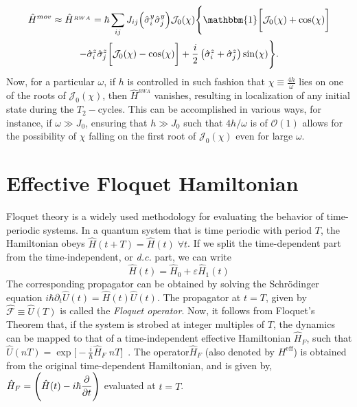 \documentclass[12pt]{iopart}
\begin{document}
\begin{multline}
    \hat{H}^{mov}\approx \hat{H}^{_{RWA}} = \hbar\sum_{ij} J_{ij} \Big(\hat{\sigma}^y_i\hat{\sigma}^y_j\Big) \mathcal{J}_0(\chi)\Bigg\{\mathbbm{1}\bigg[\mathcal{J}_0(\chi) + \cos(\chi)\bigg] \\
    -\hat{\sigma}^z_i\hat{\sigma}^z_j \bigg[\mathcal{J}_0(\chi) - \cos(\chi)\bigg] + \frac{i}{2} \left(\hat{\sigma}^z_i + \hat{\sigma}^z_j\right) \sin(\chi)\Bigg\}.
    \label{eq:hrwa}
\end{multline}	
Now, for a particular $\omega$, if $h$ is controlled in such fashion that $\chi\equiv\frac{4h}{\omega}$ lies on one of the roots of $\mathcal{J}_0(\chi)$, then $\hat{H}^{_{RWA}}$ vanishes, resulting in localization of any initial state during the $T_2-$cycles. This can be accomplished in various ways, for instance, if $\omega\gg J_0$, ensuring that $h\gg J_0$ such that $4h/\omega$ is of $\mathcal{O}(1)$ allows for the possibility of $\chi$ falling on the first root of $\mathcal{J}_0(\chi)$ even for large $\omega$.

\section{\label{sec:AppendixB} Effective Floquet Hamiltonian}

Floquet theory is a widely used methodology for evaluating the behavior of time-periodic systems.  In a quantum system that is time periodic with period $T$, the Hamiltonian obeys $\hat{H}(t+T) = \hat{H}(t)\;\forall t$. If we split the time-dependent part from the time-independent, or \textit{d.c.} part, we can write
\begin{equation*}
    \hat{H}(t) = \hat{H}_0 + \varepsilon \hat{H}_1(t)
\end{equation*}
The corresponding propagator can be obtained by solving the Schr\"odinger equation $\displaystyle{i\hbar \partial_t \hat{U}(t) = \hat{H}(t) \hat{U}(t)}$.  The propagator at $t=T$, given by $ \hat{\mathcal{F}}\equiv \hat{U}(T)$ is called the \textit{Floquet operator}. Now, it follows from Floquet's Theorem that, if the system is strobed at integer multiples of $T$, the dynamics can be mapped to that of a time-independent effective Hamiltonian $\hat{H}_F$, such that  $\displaystyle\hat{U}(nT) = \exp\bigg[-\frac{i}{\hbar}\hat{H}_F\; nT \bigg]$~\cite{Eckardt_2015}.  The operator$\hat{H}_F$ (also denoted by $H^\mathrm{eff}$) is obtained from the original time-dependent Hamiltonian, and is given by, $\displaystyle \hat{H}_F = \Bigg(\hat{H}(t) - i\hbar \pdv{t}\Bigg)$ evaluated at $t=T$. 
\end{document}
